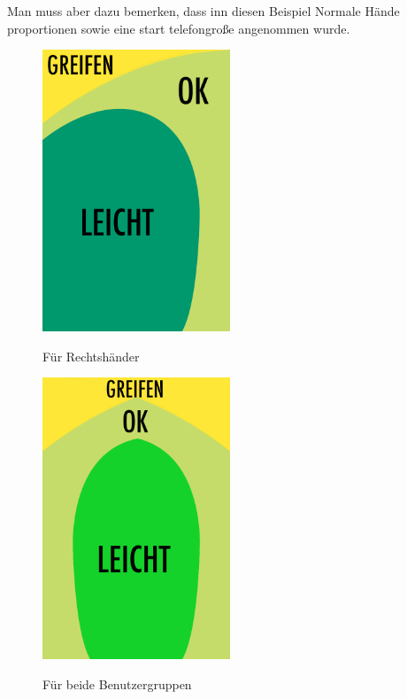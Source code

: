 Man muss aber dazu bemerken, dass inn diesen Beispiel Normale Hände proportionen sowie eine start telefongroße angenommen wurde.

\begin{figure}[h]
	\caption{Für Rechtshänder}
	\includegraphics[width=0.5\textwidth]{img/anordungDerElementeSimple.png}
	\label{fig:rechtsPositioning}
\end{figure}

\begin{figure}[h]
	\caption{Für beide Benutzergruppen}
	\includegraphics[width=0.5\textwidth]{img/anordungDerElementeForAll.png}
	\label{fig:forallPositioning}
\end{figure}

